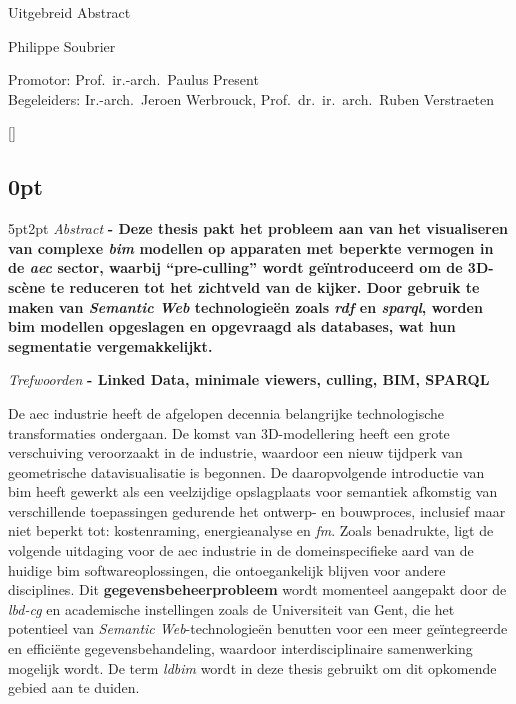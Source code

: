 \begin{center}
    \sffamily
    \huge Uitgebreid Abstract

    \Large Philippe Soubrier

    \normalsize
    Promotor: Prof.\ ir.-arch.\ Paulus Present\\
    Begeleiders: Ir.-arch.\ Jeroen Werbrouck, Prof.\ dr.\ ir.\ arch.\ Ruben Verstraeten
\end{center}
\begin{refsection}
    []{}
    \begin{multicols}{2}
        \small
        \titlespacing\subsection{0pt}{5pt}{2pt}
        \emph{Abstract} \textbf{
            - Deze thesis pakt het probleem aan van het visualiseren van complexe \emph{\ac{bim}} modellen op apparaten met beperkte vermogen in de \emph{\ac{aec}} sector, waarbij \enquote{pre-culling} wordt geïntroduceerd om de 3D-scène te reduceren tot het zichtveld van de kijker. Door gebruik te maken van \emph{Semantic Web} technologieën zoals \emph{\ac{rdf}} en \emph{\ac{sparql}}, worden \ac{bim} modellen opgeslagen en opgevraagd als databases, wat hun segmentatie vergemakkelijkt.
        }

        \emph{Trefwoorden} \textbf{
            - Linked Data, minimale viewers, culling, BIM, SPARQL
        }

        De \ac{aec} industrie heeft de afgelopen decennia belangrijke technologische transformaties ondergaan. De komst van 3D-modellering heeft een grote verschuiving veroorzaakt in de industrie, waardoor een nieuw tijdperk van geometrische datavisualisatie is begonnen. De daaropvolgende introductie van \ac{bim} heeft gewerkt als een veelzijdige opslagplaats voor semantiek afkomstig van verschillende toepassingen gedurende het ontwerp- en bouwproces, inclusief maar niet beperkt tot: kostenraming, energieanalyse en \emph{\ac{fm}}. Zoals \cite{Werbrouck2018} benadrukte, ligt de volgende uitdaging voor de \ac{aec} industrie in de domeinspecifieke aard van de huidige \ac{bim} softwareoplossingen, die ontoegankelijk blijven voor andere disciplines. Dit \textbf{gegevensbeheerprobleem} wordt momenteel aangepakt door de \emph{\ac{lbd-cg}} en academische instellingen zoals de Universiteit van Gent, die het potentieel van \emph{Semantic Web}-technologieën benutten voor een meer geïntegreerde en efficiënte gegevensbehandeling, waardoor interdisciplinaire samenwerking mogelijk wordt. De term \emph{\ac{ldbim}} wordt in deze thesis gebruikt om dit opkomende gebied aan te duiden.


\end{multicols}
\end{refsection}

